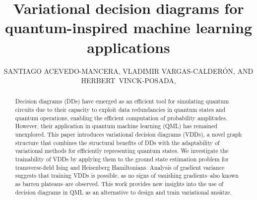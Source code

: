 \documentclass{ieeeaccess}
\begin{document}
\doi{
}

\title{Variational decision diagrams for quantum-inspired machine learning applications}
\author{\uppercase{Santiago Acevedo-Mancera}, %
\uppercase{Vladimir Vargas-Calderón, and Herbert~Vinck-Posada},
}
\address[1]{Grupo de Superconductividad y Nanotecnología, Departamento de Física, Universidad Nacional de Colombia, Bogotá, 111321, Colombia}
\address[2]{D-Wave Systems, Burnaby, British Columbia, Canada}




\begin{abstract}
Decision diagrams (DDs) have emerged as an efficient tool for simulating quantum circuits due to their capacity to exploit data redundancies in quantum states and quantum operations, enabling the efficient computation of probability amplitudes.
However, their application in quantum machine learning (QML) has remained unexplored.
This paper introduces variational decision diagrams (VDDs), a novel graph structure that combines the structural benefits of DDs with the adaptability of variational methods for efficiently representing quantum states.
We investigate the trainability of VDDs by applying them to the ground state estimation problem for transverse-field Ising and Heisenberg Hamiltonians.
Analysis of gradient variance suggests that training VDDs is possible, as no signs of vanishing gradients--also known as barren plateaus--are observed.
This work provides new insights into the use of decision diagrams in QML as an alternative to design and train variational ansätze.
\end{abstract}
\end{document}
